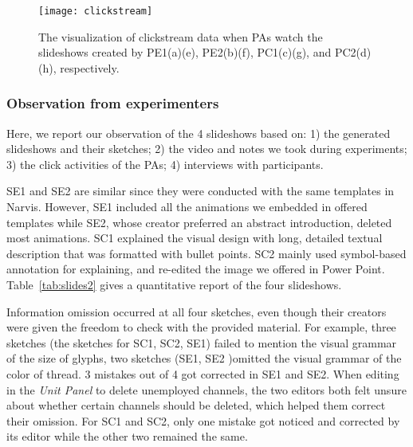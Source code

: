 \begin{figure}
 \centering %
 \texttt{[image: clickstream]}
 \caption{The visualization of clickstream data when PAs watch the slideshows created by PE1(a)(e), PE2(b)(f), PC1(c)(g), and PC2(d)(h), respectively. 
 }
 \label{fig:clickstream}
\end{figure}

\subsubsection{Observation from experimenters}

Here, we report our observation of the 4 slideshows based on: 1) the generated slideshows and their sketches; 2) the video and notes we took during experiments; 3) the click activities of the PAs; 4) interviews with participants.

SE1 and SE2 are similar since they were conducted with the same templates in Narvis. However, SE1 included all the animations we embedded in offered templates while SE2, whose creator preferred an abstract introduction, deleted most animations. SC1 explained the visual design with long, detailed textual description that was formatted with bullet points. SC2 mainly used symbol-based annotation for explaining, and re-edited the image we offered in Power Point. Table~\ref{tab:slides2} gives a quantitative report of the four slideshows.

Information omission occurred at all four sketches, even though their creators were given the freedom to check with the provided material. For example, three sketches (the sketches for SC1, SC2, SE1) failed to mention the visual grammar of the size of glyphs, two sketches (SE1, SE2 )omitted the visual grammar of the color of thread. 3 mistakes out of 4 got corrected in SE1 and SE2. When editing in the \textit{Unit Panel} to delete unemployed channels, the two editors both felt unsure about whether certain channels should be deleted, which helped them correct their omission. 
For SC1 and SC2, only one mistake got noticed and corrected by its editor while the other two remained the same.

